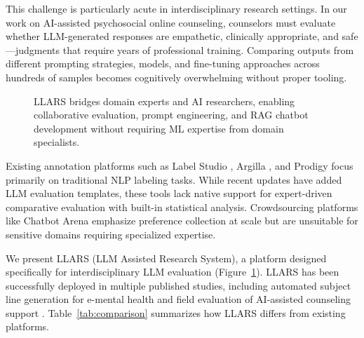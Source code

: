 \documentclass{article}
\begin{document}
This challenge is particularly acute in interdisciplinary research settings.
In our work on AI-assisted psychosocial online counseling, counselors must evaluate whether LLM-generated responses are empathetic, clinically appropriate, and safe---judgments that require years of professional training.
Comparing outputs from different prompting strategies, models, and fine-tuning approaches across hundreds of samples becomes cognitively overwhelming without proper tooling.

\begin{figure}[t]
\centering
{}
\caption{LLARS bridges domain experts and AI researchers, enabling collaborative evaluation, prompt engineering, and RAG chatbot development without requiring ML expertise from domain specialists.}
\label{fig:concept}
\end{figure}

Existing annotation platforms such as Label Studio \cite{labelstudio2024}, Argilla \cite{argilla2024}, and Prodigy \cite{prodigy2024} focus primarily on traditional NLP labeling tasks.
While recent updates have added LLM evaluation templates, these tools lack native support for expert-driven comparative evaluation with built-in statistical analysis.
Crowdsourcing platforms like Chatbot Arena \cite{zheng2024judging} emphasize preference collection at scale but are unsuitable for sensitive domains requiring specialized expertise.

We present LLARS (LLM Assisted Research System), a platform designed specifically for interdisciplinary LLM evaluation (Figure~\ref{fig:concept}).
LLARS has been successfully deployed in multiple published studies, including automated subject line generation for e-mental health \cite{steigerwald2025subjectline} and field evaluation of AI-assisted counseling support \cite{steigerwald2025caia}.
Table~\ref{tab:comparison} summarizes how LLARS differs from existing platforms.
\end{document}

